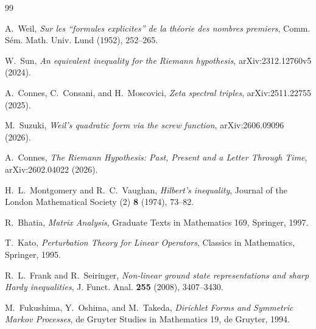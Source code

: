 \documentclass[11pt]{amsart}
\theoremstyle{definition}
\theoremstyle{remark}
\begin{document}
\begin{thebibliography}{99}

A.~Weil,
\emph{Sur les ``formules explicites'' de la théorie des nombres premiers},
Comm. Sém. Math. Univ. Lund (1952), 252--265.

W.~Sun,
\emph{An equivalent inequality for the Riemann hypothesis},
arXiv:2312.12760v5 (2024).

A.~Connes, C.~Consani, and H.~Moscovici,
\emph{Zeta spectral triples},
arXiv:2511.22755 (2025).

M.~Suzuki,
\emph{Weil's quadratic form via the screw function},
arXiv:2606.09096 (2026).

A.~Connes,
\emph{The Riemann Hypothesis: Past, Present and a Letter Through Time},
arXiv:2602.04022 (2026).

H.~L.~Montgomery and R.~C.~Vaughan,
\emph{Hilbert's inequality},
Journal of the London Mathematical Society (2) \textbf{8} (1974), 73--82.

R.~Bhatia,
\emph{Matrix Analysis},
Graduate Texts in Mathematics 169, Springer, 1997.

T.~Kato,
\emph{Perturbation Theory for Linear Operators},
Classics in Mathematics, Springer, 1995.

R.~L.~Frank and R.~Seiringer,
\emph{Non-linear ground state representations and sharp Hardy inequalities},
J. Funct. Anal. \textbf{255} (2008), 3407--3430.

M.~Fukushima, Y.~Oshima, and M.~Takeda,
\emph{Dirichlet Forms and Symmetric Markov Processes},
de Gruyter Studies in Mathematics 19, de Gruyter, 1994.

\end{thebibliography}
\end{document}
